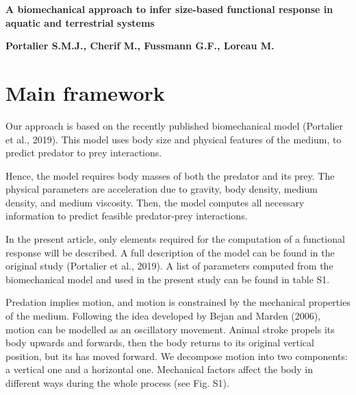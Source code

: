 \documentclass[utf8, 12 pt]{frontiers_suppmat}
\begin{document}
\onecolumn
{}

\title[Supplementary Material]{{}}


\maketitle

\begin{Large}
\textbf{A biomechanical approach to infer size-based functional response in aquatic and terrestrial systems}
\end{Large}

\begin{large}
\begin{center}
\textbf{Portalier S.M.J., Cherif M., Fussmann G.F., Loreau M.}
\end{center}
\end{large}

\vspace{2 cm}

\section{Main framework}

Our approach is based on the recently published biomechanical model (Portalier et al., 2019)⁠. This model uses body size and physical features of the medium, to predict predator to prey interactions. \par
Hence, the model requires body masses of both the predator and its prey. The physical parameters are acceleration due to gravity, body density, medium density, and medium viscosity. Then, the model computes all necessary information to predict feasible predator-prey interactions.  \par
In the present article, only elements required for the computation of a functional response will be described. A full description of the model can be found in the original study (Portalier et al., 2019)⁠. A list of parameters computed from the biomechanical model and used in the present study can be found in table S1.\par
Predation implies motion, and motion is constrained by the mechanical properties of the medium. Following the idea developed by Bejan and Marden (2006), motion can be modelled as an oscillatory movement. Animal stroke propels its body upwards and forwards, then the body returns to its original vertical position, but its has moved forward. We decompose motion into two components: a vertical one and a horizontal one. Mechanical factors affect the body in different ways during the whole process (see Fig. S1).
\end{document}
